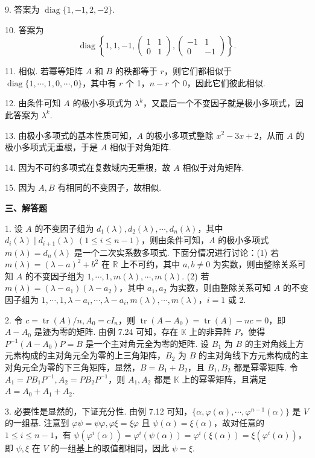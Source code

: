 \documentclass[UTF8, 12pt, fontset=fandol, oneside]{ctexart}
\begin{document}
9. 答案为 $\operatorname{diag}\{1,-1,2,-2\}$.

10. 答案为
\[
\operatorname{diag}\left\{1,1,-1,\left(\begin{array}{cc}1&1\\0&1\end{array}\right),\left(\begin{array}{cc}-1&1\\0&-1\end{array}\right)\right\}.
\]

11. 相似. 若幂等矩阵 $A$ 和 $B$ 的秩都等于 $r$，则它们都相似于 $\operatorname{diag}\{1,\cdots,1,0,\cdots,0\}$，其中有 $r$ 个 1，$n-r$ 个 0，因此它们彼此相似.

12. 由条件可知 $A$ 的极小多项式为 $\lambda^k$，又最后一个不变因子就是极小多项式，因此答案为 $\lambda^k$.

13. 由极小多项式的基本性质可知，$A$ 的极小多项式整除 $x^2-3x+2$，从而 $A$ 的极小多项式无重根，于是 $A$ 相似于对角矩阵.

14. 因为不可约多项式在复数域内无重根，故 $A$ 相似于对角矩阵.

15. 因为 $A,B$ 有相同的不变因子，故相似.

\noindent\textbf{三、解答题}

1. 设 $A$ 的不变因子组为 $d_1(\lambda),d_2(\lambda),\cdots,d_n(\lambda)$，其中 $d_i(\lambda)\mid d_{i+1}(\lambda)\ (1\le i\le n-1)$，则由条件可知，$A$ 的极小多项式 $m(\lambda)=d_n(\lambda)$ 是一个二次实系数多项式. 下面分情况进行讨论：(1) 若 $m(\lambda)=(\lambda-a)^2+b^2$ 在 $\mathbb{R}$ 上不可约，其中 $a,b\ne0$ 为实数，则由整除关系可知 $A$ 的不变因子组为 $1,\cdots,1,m(\lambda),\cdots,m(\lambda)$. (2) 若 $m(\lambda)=(\lambda-a_1)(\lambda-a_2)$，其中 $a_1,a_2$ 为实数，则由整除关系可知 $A$ 的不变因子组为 $1,\cdots,1,\lambda-a_i,\cdots,\lambda-a_i,m(\lambda),\cdots,m(\lambda)$，$i=1$ 或 2.

2. 令 $c=\operatorname{tr}(A)/n,A_0=cI_n$，则 $\operatorname{tr}(A-A_0)=\operatorname{tr}(A)-nc=0$，即 $A-A_0$ 是迹为零的矩阵. 由例 7.24 可知，存在 $\mathbb{K}$ 上的非异阵 $P$，使得 $P^{-1}(A-A_0)P=B$ 是一个主对角元全为零的矩阵. 设 $B_1$ 为 $B$ 的主对角线上方元素构成的主对角元全为零的上三角矩阵，$B_2$ 为 $B$ 的主对角线下方元素构成的主对角元全为零的下三角矩阵，显然，$B=B_1+B_2$，且 $B_1,B_2$ 都是幂零矩阵. 令 $A_1=PB_1P^{-1},A_2=PB_2P^{-1}$，则 $A_1,A_2$ 都是 $\mathbb{K}$ 上的幂零矩阵，且满足 $A=A_0+A_1+A_2$.

3. 必要性是显然的，下证充分性. 由例 7.12 可知，$\{\alpha,\varphi(\alpha),\cdots,\varphi^{n-1}(\alpha)\}$ 是 $V$ 的一组基. 注意到 $\varphi\psi=\psi\varphi,\varphi\xi=\xi\varphi$ 且 $\psi(\alpha)=\xi(\alpha)$，故对任意的 $1\le i\le n-1$，有 $\psi(\varphi^i(\alpha))=\varphi^i(\psi(\alpha))=\varphi^i(\xi(\alpha))=\xi(\varphi^i(\alpha))$，即 $\psi,\xi$ 在 $V$ 的一组基上的取值都相同，因此 $\psi=\xi$.
\end{document}
